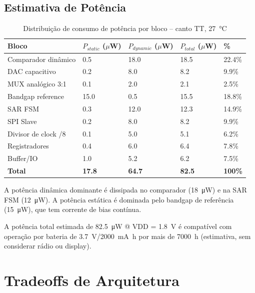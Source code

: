\documentclass[12pt,a4paper]{article}
\begin{document}
\subsection{Estimativa de Potência}

\begin{table}[H]
  \centering
  \caption{Distribuição de consumo de potência por bloco  --  canto TT, \SI{27}{\celsius}}
  \label{tab:power}
  \begin{tabular}{lllll}
    \toprule
    \textbf{Bloco} & \textbf{$P_{static}$ ($\mu$W)} &
    \textbf{$P_{dynamic}$ ($\mu$W)} & \textbf{$P_{total}$ ($\mu$W)} &
    \textbf{\%} \\
    \midrule
    Comparador dinâmico  & 0.5  & 18.0 & 18.5 & 22.4\% \\
    DAC capacitivo       & 0.2  & 8.0  & 8.2  & 9.9\%  \\
    MUX analógico 3:1    & 0.1  & 2.0  & 2.1  & 2.5\%  \\
    Bandgap reference    & 15.0 & 0.5  & 15.5 & 18.8\% \\
    SAR FSM              & 0.3  & 12.0 & 12.3 & 14.9\% \\
    SPI Slave            & 0.2  & 8.0  & 8.2  & 9.9\%  \\
    Divisor de clock /8  & 0.1  & 5.0  & 5.1  & 6.2\%  \\
    Registradores        & 0.4  & 6.0  & 6.4  & 7.8\%  \\
    Buffer/IO            & 1.0  & 5.2  & 6.2  & 7.5\%  \\
    \midrule
    \textbf{Total}       & \textbf{17.8} & \textbf{64.7} &
    \textbf{82.5} & \textbf{100\%} \\
    \bottomrule
  \end{tabular}
\end{table}

A potência dinâmica dominante é dissipada no comparador (\SI{18}{\micro\watt})
e na SAR FSM (\SI{12}{\micro\watt}). A potência estática é dominada pelo bandgap
de referência (\SI{15}{\micro\watt}), que tem corrente de bias contínua.

A potência total estimada de \SI{82.5}{\micro\watt} @ VDD = \SI{1.8}{\volt} é
compatível com operação por bateria de \SI{3.7}{\volt}/\SI{2000}{\milli\ampere\hour}
por mais de \SI{7000}{\hour} (estimativa, sem considerar rádio ou display).

\newpage

\section{Tradeoffs de Arquitetura}
\label{sec:tradeoffs}
\end{document}
